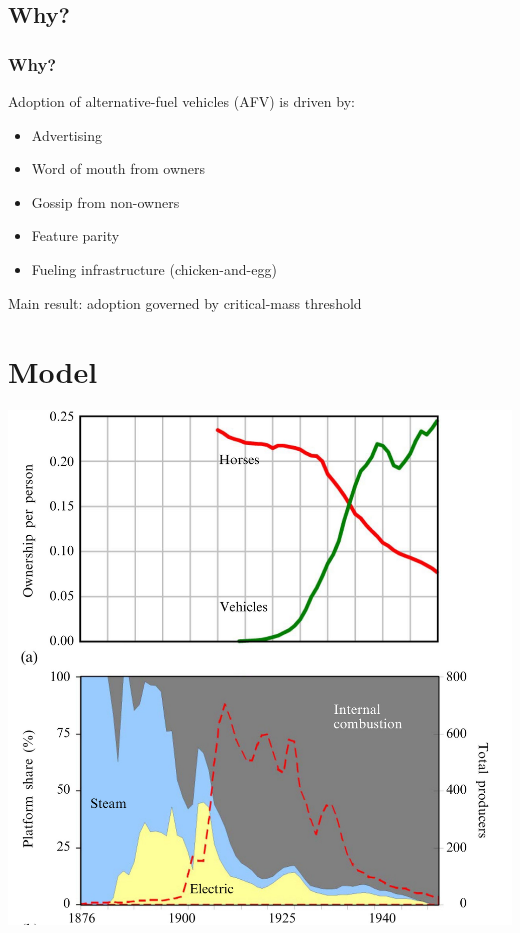 \documentclass{beamer}
\begin{document}
\subsection{Why?}


\begin{frame}
  \frametitle{Why?}
  Adoption of alternative-fuel vehicles (AFV) is driven by:
  \begin{itemize}
  \item Advertising
  \item Word of mouth from owners
  \item Gossip from non-owners
  \item Feature parity
  \item Fueling infrastructure (chicken-and-egg)
  \end{itemize}
  Main result: adoption governed by critical-mass threshold
\end{frame}

\section{Model}

\begin{frame}
  \includegraphics[height=\textheight]{Sterman-fig-1.jpg}
\end{frame}
    
\end{document}
